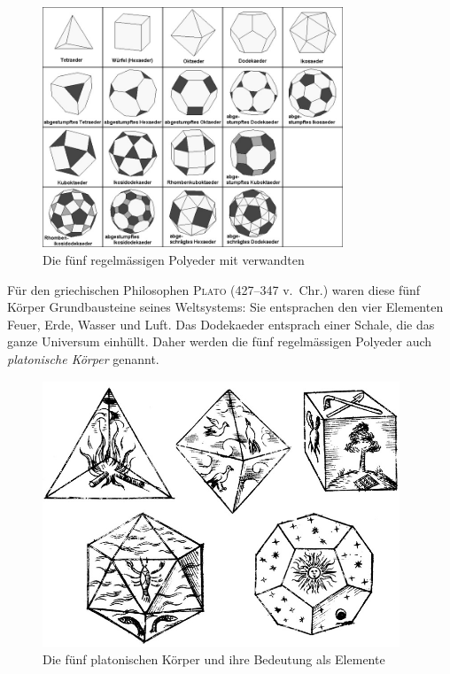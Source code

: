 \documentclass[%
11pt,%
twoside,%
titlepage,%
a4page,%
german,%
headsepline%
]{scrartcl}
\begin{document}
\begin{figure}[h!]
\begin{center}
\includegraphics[width=0.8\textwidth]{pictures/polyeders}
\end{center}
\caption{Die f\"unf regelm\"assigen Polyeder mit verwandten}
\end{figure}

F\"ur den griechischen Philosophen \textsc{Plato} (427--347 v.~Chr.) waren diese f\"unf K\"orper Grundbausteine seines Weltsystems: Sie entsprachen den vier Elementen Feuer, Erde, Wasser und Luft. Das Dodekaeder entsprach einer Schale, die das ganze Universum einh\"ullt. Daher werden die f\"unf regelm\"assigen Polyeder auch \emph{platonische K\"orper} genannt.

\begin{figure}[h!]
\begin{center}
\includegraphics[width=0.95\textwidth]{pictures/platonkoerper}
\end{center}
\caption{Die f\"unf platonischen K\"orper und ihre Bedeutung als Elemente}
\end{figure}
\end{document}
